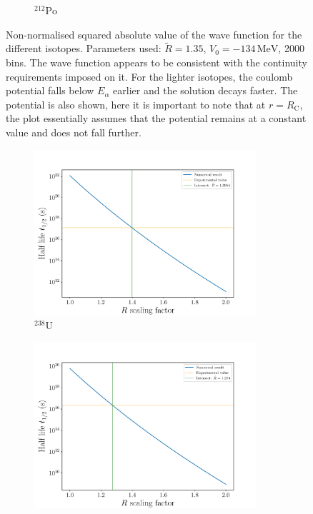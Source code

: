 \documentclass[a4paper,DIV=12,english]{scrartcl}
\begin{document}
\begin{figure}
\begin{subfigure}{0.49\textwidth}
        \caption{$^{212}\text{Po}$}
        \label{subfig:density_po212}
    \end{subfigure}
    \caption{Non-normalised squared absolute value of the wave function for the different isotopes. Parameters used: $\tilde R = 1.35$, $V_0 = - 134\,\text{MeV}$, 2000 bins. The wave function appears to be consistent with the continuity requirements imposed on it. For the lighter isotopes, the coulomb potential falls below $E_\alpha$ earlier and the solution decays faster. The potential is also shown, here it is important to note that at $r=R_\text{C}$, the plot essentially assumes that the potential remains at a constant value and does not fall further.}
    \label{fig:density}
\end{figure}

\begin{figure}
    \centering
    \begin{subfigure}{0.49\textwidth}
        \centering
        \includegraphics[width=0.9\textwidth]{../plots/R_dependence/R_u238.pdf}
        \caption{$^{238}\text{U}$}
        \label{subfig:r_u238}
    \end{subfigure}
    \begin{subfigure}{0.49\textwidth}
        \centering
        \includegraphics[width=0.9\textwidth]{../plots/R_dependence/R_u235.pdf}

\end{subfigure}
\end{figure}
\end{document}
